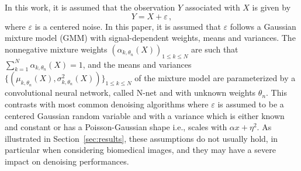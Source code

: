 \documentclass{article}
\begin{document}
In this work, it is assumed that the observation $Y$ associated with $X$  is given by
\begin{equation}
\label{eq:def:Y}
Y = X + \varepsilon\,,
\end{equation}
where $\varepsilon$ is a centered noise. In this paper, it is assumed that $\varepsilon$ follows a Gaussian mixture model (GMM) with signal-dependent weights, means and variances.
The nonnegative mixture weights $(\alpha_{k,\theta_n}(X))_{1\leqslant k\leqslant N}$ are such that $\sum_{k=1}^N\alpha_{k,\theta_n}(X) = 1$, and the means and variances $\{(\mu_{k,\theta_n}(X),\sigma_{k,\theta_n}^2(X))\}_{1\leqslant k\leqslant N}$ of the mixture model are  parameterized by a convolutional neural network, called N-net and with unknown weights $\theta_n$.
This contrasts with most common denoising algorithms where $\varepsilon$ is assumed to be a centered Gaussian random variable and with a variance which is either known and constant or has a Poisson-Gaussian shape i.e., scales with $\alpha x + \eta^2$.
As illustrated in Section~\ref{sec:results}, these assumptions do not usually hold, in particular when considering biomedical images, and they may have a severe impact on denoising performances.
\end{document}
